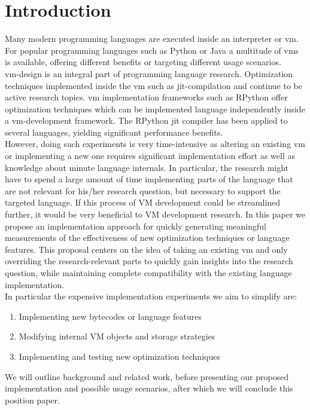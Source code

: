 \documentclass[preprint, nonatbib]{sigplanconf}
\begin{document}
\section{Introduction}
Many modern programming languages are executed inside an interpreter or \gls{vm}. For popular programming languages such as Python or Java a multitude of \glspl{vm} is available, offering different benefits or targeting different usage scenarios.\\
\Gls{vm}-design is an integral part of programming language research. Optimization techniques implemented inside the \gls{vm} such as \gls{jit}-compilation and continue to be active research topics. \gls{vm} implementation frameworks such as RPython \cite{ancona2007rpython} offer optimization techniques which can be implemented language independently inside a \gls{vm}-development framework. The RPython \gls{jit} compiler has been applied to several languages, yielding significant performance benefits. \\
However, doing such experiments is very time-intensive as altering an existing \gls{vm} or implementing a new one requires significant implementation effort as well as knowledge about minute language internals. In particular, the research might have to spend a large amount of time implementing parts of the language that are not relevant for his/her research question, but necessary to support the targeted language. If this process of VM development could be streamlined further, it would be very beneficial to VM development research. In this paper we propose an implementation approach for quickly generating meaningful measurements of the effectiveness of new optimization techniques or language features. This proposal centers on the idea of taking an existing \gls{vm} and only overriding the research-relevant parts to quickly gain insights into the research question, while maintaining complete compatibility with the existing language implementation.\\
In particular the expensive implementation experiments we aim to simplify are:
\begin{enumerate}
\item Implementing new bytecodes or language features
\item Modifying internal VM objects and storage strategies
\item Implementing and testing new optimization techniques
\end{enumerate}
We will outline background and related work, before presenting our proposed implementation and possible usage scenarios, after which we will conclude this position paper.
\end{document}
